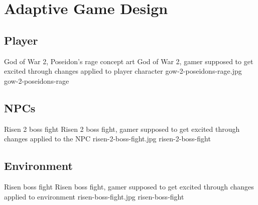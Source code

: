 \section{Adaptive Game Design}
\subsection{Player}

\largeimg
{God of War 2, Poseidon's rage concept art}
{God of War 2, gamer supposed to get excited through changes applied to player character}
{gow-2-poseidons-rage.jpg}
{gow-2-poseidons-rage}

\subsection{NPCs}

\largeimg
{Risen 2 boss fight}
{Risen 2 boss fight, gamer supposed to get excited through changes applied to the NPC}
{risen-2-boss-fight.jpg}
{risen-2-boss-fight}

\subsection{Environment}

\largeimg
{Risen boss fight}
{Risen boss fight, gamer supposed to get excited through changes applied to environment}
{risen-boss-fight.jpg}
{risen-boss-fight}


